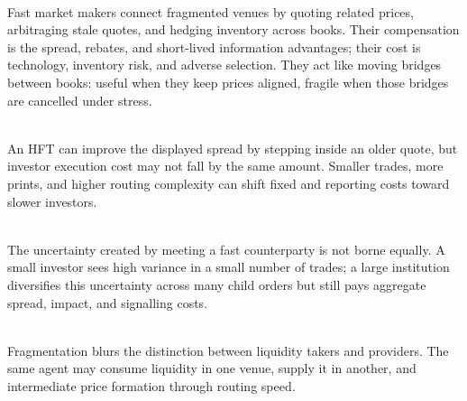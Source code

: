 \begin{mechanism} \\
Fast market makers connect fragmented venues by quoting related prices, arbitraging stale quotes, and hedging inventory across books. Their compensation is the spread, rebates, and short-lived information advantages; their cost is technology, inventory risk, and adverse selection. They act like moving bridges between books: useful when they keep prices aligned, fragile when those bridges are cancelled under stress.
\end{mechanism}

\begin{caveat} \\
An HFT can improve the displayed spread by stepping inside an older quote, but investor execution cost may not fall by the same amount. Smaller trades, more prints, and higher routing complexity can shift fixed and reporting costs toward slower investors.
\end{caveat}

\begin{caveat} \\
The uncertainty created by meeting a fast counterparty is not borne equally. A small investor sees high variance in a small number of trades; a large institution diversifies this uncertainty across many child orders but still pays aggregate spread, impact, and signalling costs.
\end{caveat}

\begin{caveat} \\
Fragmentation blurs the distinction between liquidity takers and providers. The same agent may consume liquidity in one venue, supply it in another, and intermediate price formation through routing speed.
\end{caveat}
